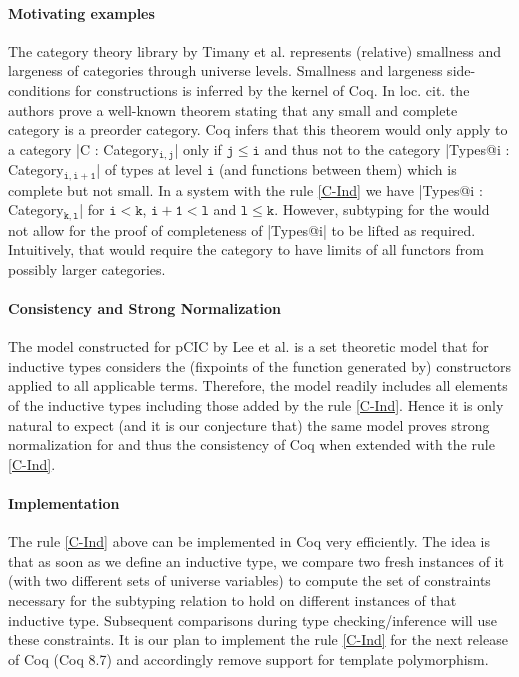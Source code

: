 \documentclass{easychair}
\begin{document}
\paragraph{Motivating examples}
The category theory library by Timany et
al. \cite{DBLP:conf/rta/Timany016} represents (relative) smallness and
largeness of categories through universe levels. Smallness and largeness
side-conditions for constructions is inferred by the kernel of Coq. In
loc. cit. the authors prove a well-known theorem stating that any small
and complete category is a preorder category. Coq infers that this
theorem would only apply to a category
\Coqe|C : Category$_{\mathtt{i, j}}$| only if $\mathtt{j \le i}$ and thus not to
the category \Coqe|Types@{i} : Category$_{\mathtt{i, i + 1}}$| of types
at level $\mathtt{i}$ (and functions between them) which is complete but
not small.  In a system with the rule \ref{C-Ind} we have
\Coqe|Types@{i} : Category$_{\mathtt{k, l}}$| for $\mathtt{i < k}$,
$\mathtt{i + 1 < l}$ and $\mathtt{l \le k}$. However, subtyping for the
would not allow for the proof of completeness of \Coqe|Types@{i}| to be
lifted as required. Intuitively, that would require the category to have
limits of all functors from possibly larger categories.

\paragraph{Consistency and Strong Normalization}
The model constructed for pCIC by Lee et
al. \cite{DBLP:journals/corr/abs-1111-0123} is a set theoretic model
that for inductive types considers the (fixpoints of the function
generated by) constructors applied to all applicable terms. Therefore,
the model readily includes all elements of the inductive types
including those added by the rule \ref{C-Ind}. Hence it is only
natural to expect (and it is our conjecture that) the same model
proves strong normalization for and thus the consistency of Coq when
extended with the rule \ref{C-Ind}.


\paragraph{Implementation}
The rule \ref{C-Ind} above can be implemented in Coq very efficiently.
The idea is that as soon as we define an inductive type, we compare
two fresh instances of it (with two different sets of universe
variables) to compute the set of constraints necessary for the subtyping
relation to hold on different instances of that inductive type. Subsequent
comparisons during type checking/inference will use these constraints.
It is our plan to implement the rule \ref{C-Ind} for the next release
of Coq (Coq 8.7) and accordingly remove support for template
polymorphism.

\setlength{\bibsep}{0pt} %
\renewcommand{\bibfont}{\small} %


\end{document}
